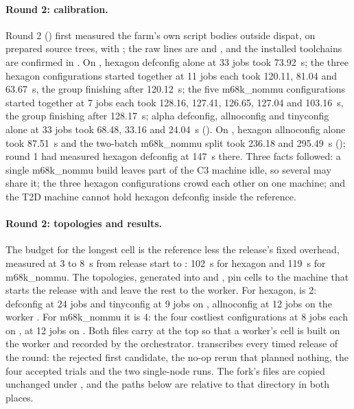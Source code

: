 \paragraph{Round 2: calibration.}
Round 2 () first measured the
farm's own script bodies outside dispat, on prepared source trees, with
; the raw lines are
 and , and
the installed toolchains are confirmed in
. On , hexagon defconfig
alone at 33 jobs took 73.92~s; the three hexagon configurations started
together at 11 jobs each took 120.11, 81.04 and 63.67~s, the group finishing
after 120.12~s; the five m68k\_nommu configurations started together at 7 jobs
each took 128.16, 127.41, 126.65, 127.04 and 103.16~s, the group finishing
after 128.17~s; alpha defconfig, allnoconfig and tinyconfig alone at 33 jobs
took 68.48, 33.16 and 24.04~s (). On ,
hexagon allnoconfig alone took 87.51~s and the two-batch m68k\_nommu split took
236.18 and 295.49~s (); round 1 had measured hexagon
defconfig at 147~s there. Three facts followed: a single m68k\_nommu build
leaves part of the C3 machine idle, so several may share it; the three
hexagon configurations crowd each other on one machine; and the T2D machine
cannot hold hexagon defconfig inside the reference.

\paragraph{Round 2: topologies and results.}
The budget for the longest cell is the reference less the release's fixed
overhead, measured at 3 to 8~s from release start to :
102~s for hexagon and 119~s for m68k\_nommu. The topologies, generated into
 and
, pin cells to the machine that starts the
release with  and leave the rest to the worker.
For hexagon,  is 2: defconfig at 24 jobs and
tinyconfig at 9 jobs on , allnoconfig at 12 jobs on the
 worker . For m68k\_nommu it is 4: the four
costliest configurations at 8 jobs each on ,  at
12 jobs on . Both files carry 
at the top so that a worker's cell is built on the worker and recorded by the
orchestrator.  transcribes every timed release of
the round: the rejected first candidate, the no-op rerun that planned
nothing, the four accepted trials and the two single-node runs. The fork's
files are copied unchanged under
,
and the paths below are relative to that directory in both places.

